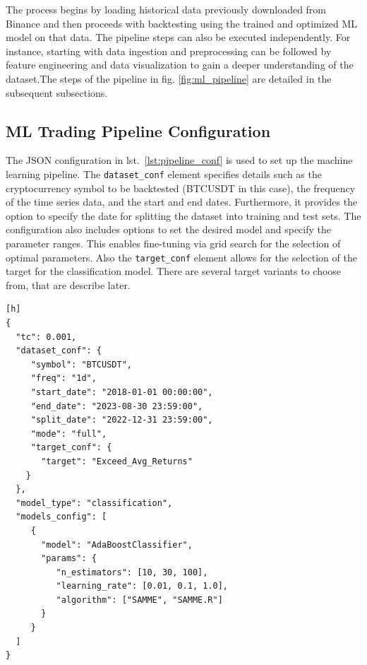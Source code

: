 The process begins by loading historical data previously downloaded from Binance and then proceeds with backtesting using the trained and optimized ML model on that data.
The pipeline steps can also be executed independently.
For instance, starting with data ingestion and preprocessing can be followed by feature engineering and data visualization to gain a deeper understanding of the dataset.The steps of the pipeline in fig. \ref{fig:ml_pipeline} are detailed in the subsequent subsections.

\subsection{ML Trading Pipeline Configuration}
The JSON configuration in lst.~\ref{lst:pipeline_conf} is used to set up the machine learning pipeline.
The \texttt{dataset\_conf} element specifies details such as the cryptocurrency symbol to be backtested (BTCUSDT in this case), the frequency of the time series data, and the start and end dates.
Furthermore, it provides the option to specify the date for splitting the dataset into training and test sets.
The configuration also includes options to set the desired model and specify the parameter ranges.
This enables fine-tuning via grid search for the selection of optimal parameters.
Also the \texttt{target\_conf} element allows for the selection of the target for the classification model. There are several target variants to choose from, that are describe later.



\noindent\begin{minipage}{\linewidth}
\begin{lstlisting}[style=jsonstyle, caption={Machine Learning Pipeline Configuration},  captionpos=b, label=lst:pipeline_conf][h]
{
  "tc": 0.001,
  "dataset_conf": {
     "symbol": "BTCUSDT",
     "freq": "1d",
     "start_date": "2018-01-01 00:00:00",
     "end_date": "2023-08-30 23:59:00",
     "split_date": "2022-12-31 23:59:00",
     "mode": "full",
     "target_conf": {
       "target": "Exceed_Avg_Returns"
    }
  },
  "model_type": "classification",
  "models_config": [
     {
       "model": "AdaBoostClassifier",
       "params": {
          "n_estimators": [10, 30, 100],
          "learning_rate": [0.01, 0.1, 1.0],
          "algorithm": ["SAMME", "SAMME.R"]
       }
     }
  ]
}
\end{lstlisting}
\end{minipage}


